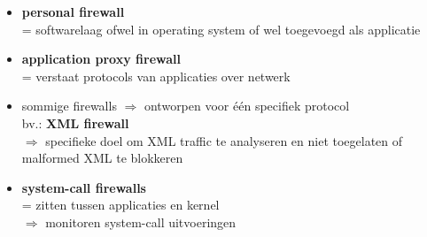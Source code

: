 \documentclass{report}
\begin{document}
\begin{itemize}
\item \textbf{personal firewall}
\\= softwarelaag ofwel in operating system of wel toegevoegd als applicatie
\item \textbf{application proxy firewall}
\\= verstaat protocols van applicaties over netwerk
\item sommige firewalls $\Rightarrow$ ontworpen voor \'e\'en specifiek protocol
\\bv.: \textbf{XML firewall}
\\$\Rightarrow$ specifieke doel om XML traffic te analyseren en niet toegelaten of malformed XML te blokkeren
\item \textbf{system-call firewalls}
\\= zitten tussen applicaties en kernel
\\$\Rightarrow$ monitoren system-call uitvoeringen
\end{itemize}
\end{document}
